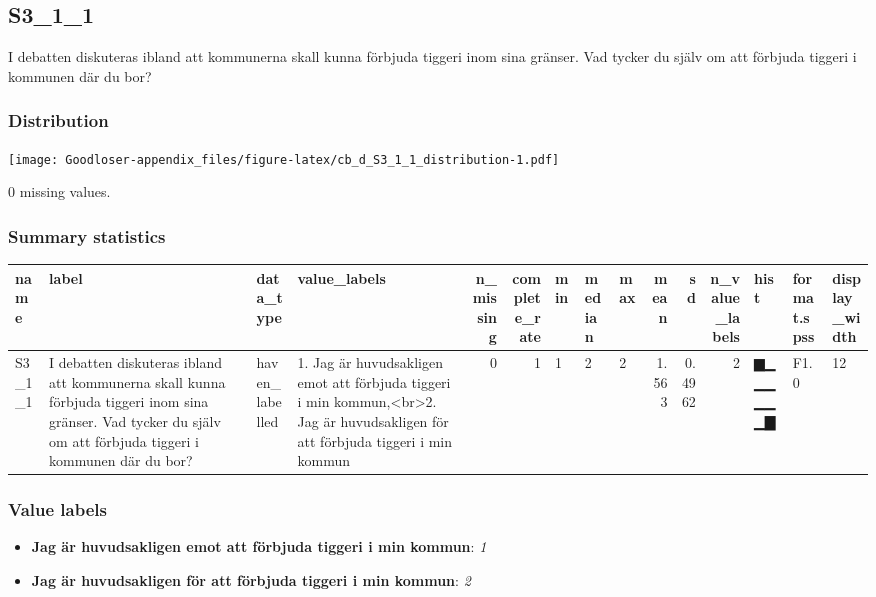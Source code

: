 \documentclass[
]{book}
\providecommand{\tightlist}{%
  \setlength{\itemsep}{0pt}\setlength{\parskip}{0pt}}
\begin{document}
\hypertarget{S3_1_1}{%
\subsection{S3\_1\_1}\label{S3_1_1}}

I debatten diskuteras ibland att kommunerna skall kunna förbjuda tiggeri inom sina gränser. Vad tycker du själv om att förbjuda tiggeri i kommunen där du bor?

\hypertarget{S3_1_1_distribution}{%
\subsubsection{Distribution}\label{S3_1_1_distribution}}

\texttt{[image: Goodloser-appendix\_files/figure-latex/cb\_d\_S3\_1\_1\_distribution-1.pdf]}

0 missing values.

\hypertarget{S3_1_1_summary}{%
\subsubsection{Summary statistics}\label{S3_1_1_summary}}

\begin{tabular}{l|l|l|l|r|r|l|l|l|r|r|r|l|l|l}
\hline
name & label & data_type & value_labels & n_missing & complete_rate & min & median & max & mean & sd & n_value_labels & hist & format.spss & display_width\\
\hline
S3_1_1 & I debatten diskuteras ibland att kommunerna skall kunna förbjuda tiggeri inom sina gränser. Vad tycker du själv om att förbjuda tiggeri i kommunen där du bor? & haven_labelled & 1. Jag är huvudsakligen emot att förbjuda tiggeri i min kommun,<br>2. Jag är huvudsakligen för att förbjuda tiggeri i min kommun & 0 & 1 & 1 & 2 & 2 & 1.563 & 0.4962 & 2 & ▆▁▁▁▁▁▁▇ & F1.0 & 12\\
\hline
\end{tabular}

\hypertarget{S3_1_1_labels}{%
\subsubsection{Value labels}\label{S3_1_1_labels}}

\begin{itemize}
\tightlist
\item
  \textbf{Jag är huvudsakligen emot att förbjuda tiggeri i min kommun}: \emph{1}
\item
  \textbf{Jag är huvudsakligen för att förbjuda tiggeri i min kommun}: \emph{2}
\end{itemize}
\end{document}
